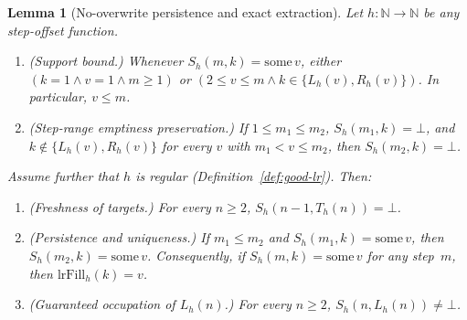 \documentclass[11pt]{article}
\newtheorem{lemma}[theorem]{Lemma}
\theoremstyle{definition}
\newcommand{\N}{\mathbb{N}}
\begin{document}
\begin{lemma}[No-overwrite persistence and exact extraction]
\label{lem:lr-persist}
Let $h : \N \to \N$ be any step-offset function.
\begin{enumerate}
\item[\textup{(a)}] \textup{(Support bound.)} Whenever $S_h(m, k) = \mathrm{some}\,v$, either $(k = 1 \wedge v = 1 \wedge m \ge 1)$ or $(2 \le v \le m \wedge k \in \{L_h(v), R_h(v)\})$. In particular, $v \le m$.
\item[\textup{(b)}] \textup{(Step-range emptiness preservation.)} If $1 \le m_1 \le m_2$, $S_h(m_1, k) = \bot$, and $k \notin \{L_h(v), R_h(v)\}$ for every $v$ with $m_1 < v \le m_2$, then $S_h(m_2, k) = \bot$.
\end{enumerate}
Assume further that $h$ is regular (Definition~\ref{def:good-lr}). Then:
\begin{enumerate}
\item[\textup{(c)}] \textup{(Freshness of targets.)} For every $n \ge 2$, $S_h(n - 1, T_h(n)) = \bot$.
\item[\textup{(d)}] \textup{(Persistence and uniqueness.)} If $m_1 \le m_2$ and $S_h(m_1, k) = \mathrm{some}\,v$, then $S_h(m_2, k) = \mathrm{some}\,v$. Consequently, if $S_h(m, k) = \mathrm{some}\,v$ for any step~$m$, then $\mathrm{lrFill}_h(k) = v$.
\item[\textup{(e)}] \textup{(Guaranteed occupation of $L_h(n)$.)} For every $n \ge 2$, $S_h(n, L_h(n)) \ne \bot$.
\end{enumerate}
\end{lemma}
\end{document}
